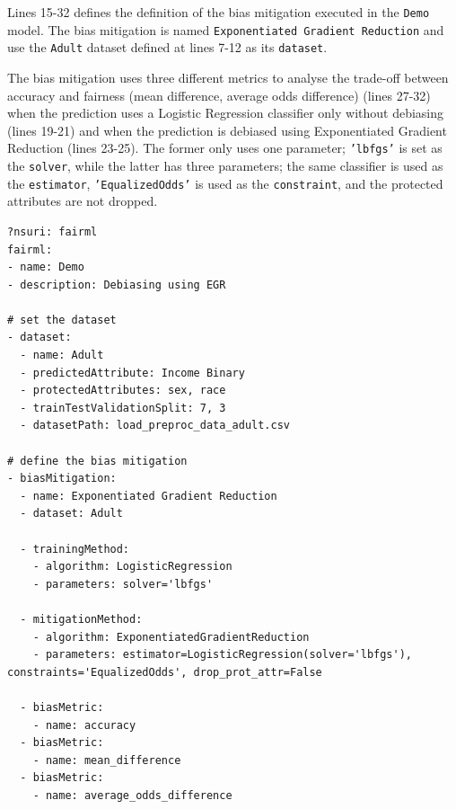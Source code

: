 \documentclass[sigconf,review]{acmart}
\begin{document}
{		Lines 15-32 defines the definition of the bias mitigation executed in the \texttt{Demo} model. The bias mitigation is named \texttt{Exponentiated Gradient Reduction} and use the \texttt{Adult} dataset defined at lines 7-12 as its \texttt{dataset}. 
		
		The bias mitigation uses three different metrics to analyse the trade-off between accuracy and fairness (mean difference, average odds difference) (lines 27-32) when the prediction uses a Logistic Regression classifier only without debiasing (lines 19-21) and when the prediction is debiased using Exponentiated Gradient Reduction (lines 23-25). The former only uses one parameter; \texttt{'lbfgs'} is set as the \texttt{solver}, while the latter has three parameters; the same classifier is used as the \texttt{estimator}, \texttt{'EqualizedOdds'} is used as the \texttt{constraint}, and the protected attributes are not dropped.
		
\begin{lstlisting}[firstnumber=1,style=yaml,caption={Bias mitigation using  Demo Exponentiated Gradient Reduction  expressed in YAML.},label=lst:fairml_model]
?nsuri: fairml
fairml:
- name: Demo
- description: Debiasing using EGR

# set the dataset
- dataset:
  - name: Adult
  - predictedAttribute: Income Binary
  - protectedAttributes: sex, race
  - trainTestValidationSplit: 7, 3
  - datasetPath: load_preproc_data_adult.csv

# define the bias mitigation
- biasMitigation:
  - name: Exponentiated Gradient Reduction  
  - dataset: Adult

  - trainingMethod:
    - algorithm: LogisticRegression
    - parameters: solver='lbfgs'

  - mitigationMethod:
    - algorithm: ExponentiatedGradientReduction
    - parameters: estimator=LogisticRegression(solver='lbfgs'), constraints='EqualizedOdds', drop_prot_attr=False

  - biasMetric:
    - name: accuracy
  - biasMetric:
    - name: mean_difference
  - biasMetric:
    - name: average_odds_difference
\end{lstlisting}
		
}
\end{document}
